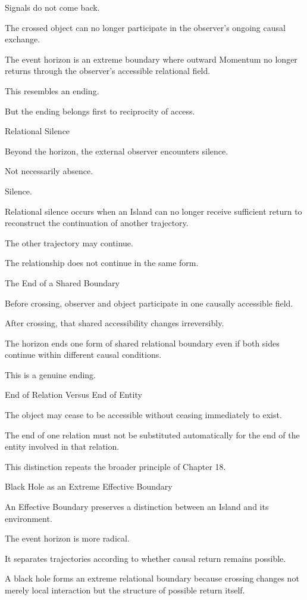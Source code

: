 Signals do not come back.

The crossed object can no longer participate in the observer’s ongoing causal exchange.

The event horizon is an extreme boundary where outward Momentum no longer returns through the observer’s accessible relational field.

This resembles an ending.

But the ending belongs first to reciprocity of access.

Relational Silence

Beyond the horizon, the external observer encounters silence.

Not necessarily absence.

Silence.

Relational silence occurs when an Island can no longer receive sufficient return to reconstruct the continuation of another trajectory.

The other trajectory may continue.

The relationship does not continue in the same form.

The End of a Shared Boundary

Before crossing, observer and object participate in one causally accessible field.

After crossing, that shared accessibility changes irreversibly.

The horizon ends one form of shared relational boundary even if both sides continue within different causal conditions.

This is a genuine ending.

End of Relation Versus End of Entity

The object may cease to be accessible without ceasing immediately to exist.

The end of one relation must not be substituted automatically for the end of the entity involved in that relation.

This distinction repeats the broader principle of Chapter 18.

Black Hole as an Extreme Effective Boundary

An Effective Boundary preserves a distinction between an Island and its environment.

The event horizon is more radical.

It separates trajectories according to whether causal return remains possible.

A black hole forms an extreme relational boundary because crossing changes not merely local interaction but the structure of possible return itself.

